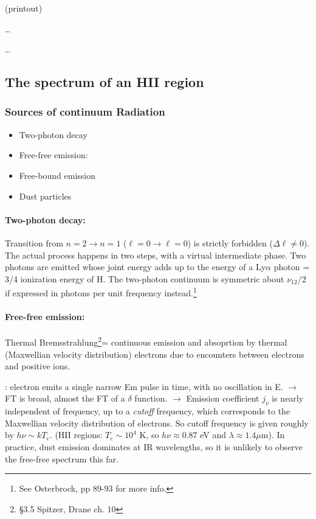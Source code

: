 \documentclass[11pt]{article}
\newcommand{\mar}[1]{\hspace{0pt}\marginpar{-\textcolor{black}{#1}-}}
\begin{document}
\mar{60}(printout)

\mar{61}\ldots

\mar{62}\ldots

\subsection{The spectrum of an HII region}

\subsubsection{Sources of continuum Radiation}
\begin{itemize}
    \item \mar{63}Two-photon decay
    \item Free-free emission:
    \item Free-bound emission
    \item Dust particles
\end{itemize}

\paragraph{Two-photon decay:}
Transition from $n=2 \rightarrow n=1$ ($\ell=0 \rightarrow \ell=0$) is strictly
forbidden ($\Delta\ell \neq 0$). The actual process happens in two steps, with
a virtual intermediate phase. Two photons are emitted whose joint energy adds
up to the energy of a Ly$\alpha$ photon = 3/4 ionization energy of H. The
two-photon continuum is symmetric about $\nu_{12}/2$ if expressed in photons
per unit frequency instead.\footnote{See Osterbrock, pp 89-93 for more info.}

\paragraph{Free-free emission:}
Thermal Bremsstrahlung\footnote{ \S{3.5}
Spitzer, Drane ch. 10}= continuous emission and absoprtion by thermal
(Maxwellian velocity distribution) electrons due to encounters between
electrons and positive ions.

\underline{}: electron emits a single narrow Em pulse
in time, with no oscillation in E. $\rightarrow$ FT is broad, almost
the FT of a $\delta$ function. $\rightarrow$ Emission coefficient
$j_{\nu}$ is nearly independent of frequency, up to a \emph{cutoff}
frequency, which corresponds to the Maxwellian velocity distribution of
electrons. \mar{64}So cutoff frequency is given roughly by $h\nu \sim
kT_{e}$. (HII regions: $T_{e} \sim 10^{4}$ K, so $h\nu \approx 0.87$ eV
and $\lambda \approx 1.4 \mu$m). In practice, dust emission dominates at
IR wavelengths, so it is unlikely to observe the free-free spectrum
this far.
\end{document}

